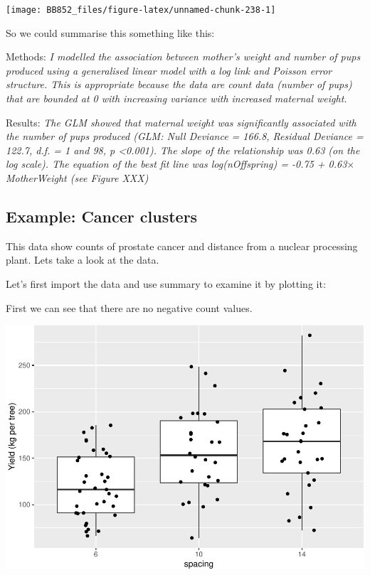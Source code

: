 \documentclass[
  a4paperpaper,
]{book}
\begin{document}
\begin{center}\texttt{[image: BB852\_files/figure-latex/unnamed-chunk-238-1]} \end{center}

So we could summarise this something like this:

Methods: \emph{I modelled the association between mother's weight and number of pups produced using a generalised linear model with a log link and Poisson error structure. This is appropriate because the data are count data (number of pups) that are bounded at 0 with increasing variance with increased maternal weight.}

Results: \emph{The GLM showed that maternal weight was significantly associated with the number of pups produced (GLM: Null Deviance = 166.8, Residual Deviance = 122.7, d.f. = 1 and 98, p \textless0.001). The slope of the relationship was 0.63 (on the log scale). The equation of the best fit line was log(nOffspring) = -0.75 + 0.63\(\times\)MotherWeight (see Figure XXX)}

\hypertarget{example-cancer-clusters}{%
\subsection{Example: Cancer clusters}\label{example-cancer-clusters}}

This data show counts of prostate cancer and distance from a nuclear processing plant. Lets take a look at the data.

Let's first import the data and use summary to examine it by plotting it:

First we can see that there are no negative count values.

\begin{center}\includegraphics{BB852_files/figure-latex/unnamed-chunk-239-1} \end{center}
\end{document}
